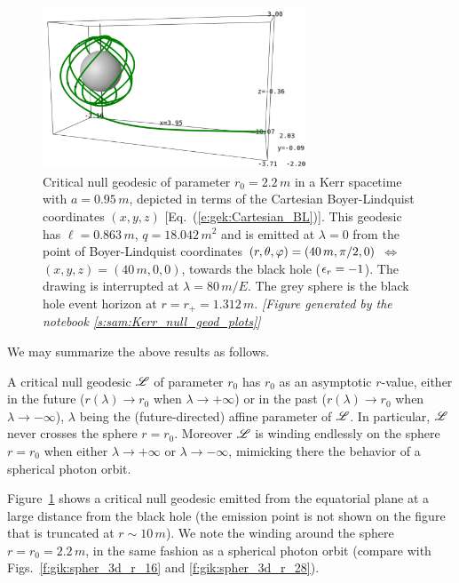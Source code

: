 \begin{figure}
\centerline{\includegraphics[width=0.7\textwidth]{gik_critical_geod.png}}
\caption[]{\label{f:gik:gik_critical_geod} \footnotesize
Critical null geodesic of parameter $r_0=2.2\, m$ in a Kerr spacetime
with $a=0.95\, m$, depicted in terms of the  Cartesian Boyer-Lindquist coordinates
$(x,y,z)$ [Eq.~(\ref{e:gek:Cartesian_BL})]. This geodesic has $\ell = 0.863\, m$,
$q = 18.042\, m^2$ and is emitted at $\lambda=0$
from the point of Boyer-Lindquist coordinates $(r,\theta,\varphi) = (40\, m, \pi/2, 0)$
$\iff$ $(x,y,z) = (40\, m, 0, 0)$,
towards the black hole ($\epsilon_r = -1$). The drawing is interrupted at
$\lambda=80\, m/E$. The grey sphere is the black hole event horizon at
$r = r_+ = 1.312\, m$.
\textsl{[Figure generated by the notebook \ref{s:sam:Kerr_null_geod_plots}]}
}
\end{figure}

We may summarize the above results as follows.
\begin{greybox}
A critical null geodesic $\mathscr{L}$ of parameter $r_0$ has $r_0$ as an asymptotic $r$-value,
either in the future ($r(\lambda) \to r_0$ when $\lambda\to +\infty$) or in the
past ($r(\lambda) \to r_0$ when $\lambda\to -\infty$), $\lambda$ being the (future-directed) affine
parameter of $\mathscr{L}$. In particular, $\mathscr{L}$ never crosses the sphere $r=r_0$.
Moreover $\mathscr{L}$ is winding endlessly on the sphere $r=r_0$ when
either $\lambda\to+\infty$ or $\lambda\to-\infty$, mimicking there the behavior of
a spherical photon orbit.
\end{greybox}



\begin{example} \label{x:gik:critical_geod}
Figure~\ref{f:gik:gik_critical_geod} shows a critical null geodesic
emitted from the equatorial plane at a large distance from the black hole
(the emission point is not shown on the figure that is truncated
at $r\sim 10\, m$). We note the winding around the sphere $r=r_0 = 2.2\, m$,
in the same fashion as a spherical photon orbit (compare with Figs.~\ref{f:gik:spher_3d_r_16}
and \ref{f:gik:spher_3d_r_28}).
\end{example}

